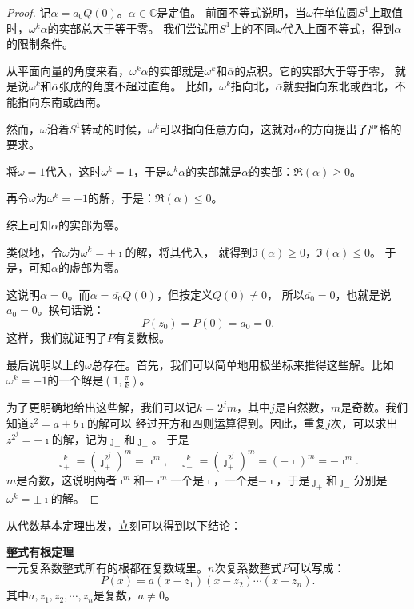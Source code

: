 \documentclass[12pt,UTF8]{ctexbook}
\begin{document}
\begin{appendix}
\begin{proof}
    记$\alpha = \overline{a_0} Q(0)$。$\alpha \in\mathbb{C}$是定值。
    前面不等式说明，当$\omega$在单位圆$S^1$上取值时，$\omega^k \alpha$的实部总大于等于零。
    我们尝试用$S^1$上的不同$\omega$代入上面不等式，得到$\alpha$的限制条件。

    从平面向量的角度来看，$\omega^k \alpha$的实部就是$\omega^k$和$\overline{\alpha}$的点积。它的实部大于等于零，
    就是说$\omega^k$和$\overline{\alpha}$张成的角度不超过直角。
    比如，$\omega^k$指向北，$\overline{\alpha}$就要指向东北或西北，不能指向东南或西南。

    然而，$\omega$沿着$S^1$转动的时候，$\omega^k$可以指向任意方向，这就对$\alpha$的方向提出了严格的要求。

    将$\omega = 1$代入，这时$\omega^k = 1$，于是$\omega^k \alpha$的实部就是$\alpha$的实部：$\Re(\alpha) \geqslant 0$。

    再令$\omega$为$\omega^k = -1$的解，于是：$\Re(\alpha) \leqslant 0$。%

    综上可知$\alpha$的实部为零。

    类似地，令$\omega$为$\omega^k = \pm \imath$的解，将其代入，%
    就得到$\Im(\alpha) \geqslant 0$，$\Im(\alpha) \leqslant 0$。
    于是，可知$\alpha$的虚部为零。

    这说明$\alpha = 0$。而$\alpha = \overline{a_0} Q(0)$，但按定义$Q(0)\neq 0$，
    所以$\overline{a_0} = 0$，也就是说$a_0 = 0$。换句话说：
    $$ P(z_0) = P(0) = a_0 = 0. $$
    这样，我们就证明了$P$有复数根。

    最后说明以上的$\omega$总存在。首先，我们可以简单地用极坐标来推得这些解。比如$\omega^k = -1$的一个解是$\left(1, \frac{\pi}{k}\right)$。
    
    为了更明确地给出这些解，我们可以记$k = 2^j m$，其中$j$是自然数，$m$是奇数。我们知道$z^2 = a + b\imath$的解可以
    经过开方和四则运算得到。因此，重复$j$次，可以求出$z^{2^j} = \pm \imath$的解，记为$\jmath_+$和$\jmath_-$。
    于是
    $$\jmath_+^k = \left(\jmath_+^{2^j}\right)^m = \imath^m, \quad \jmath_-^k = \left(\jmath_+^{2^j}\right)^m = (-\imath)^m = -\imath^m.$$
    $m$是奇数，这说明两者$\imath^m$和$-\imath^m$一个是$\imath$，一个是$-\imath$，于是$\jmath_+$和$\jmath_-$分别是$\omega^k = \pm \imath$的解。

\end{proof}

从代数基本定理出发，立刻可以得到以下结论：

\begin{tm}{\textbf{整式有根定理}}
    \mbox{} \\
    \indent 一元复系数整式所有的根都在复数域里。$n$次复系数整式$P$可以写成：
    $$ P(x) = a(x - z_1)(x - z_2)\cdots(x - z_n).$$
    其中$a, z_1, z_2,\cdots, z_n$是复数，$a\neq 0$。   
\end{tm}


\end{appendix}
\end{document}
